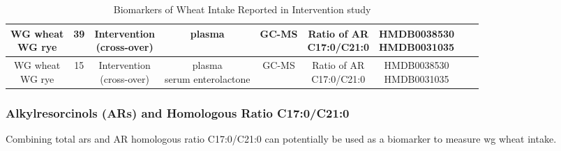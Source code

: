 \begin{table}[h!]
{\begin{tabular}{|c|c|c|c|c|c|c|c|c|}
			\makecell{WG wheat\\WG rye} & 39 & \makecell{Intervention\\ (cross-over)} & plasma & GC-MS & \makecell{Ratio of AR\\C17:0/C21:0} & \makecell{HMDB0038530\\HMDB0031035} &\cite{ISI:000376712600013} \\ 
			\hline 
			
			\makecell{WG wheat\\WG rye} & 15 & \makecell{Intervention\\ (cross-over)} & \makecell{plasma\\serum enterolactone} & GC-MS & \makecell{Ratio of AR\\C17:0/C21:0} & \makecell{HMDB0038530\\HMDB0031035} &\cite{10.1093/jn/137.5.1137} \\ 
			\hline 
	\end{tabular} }
	\caption{Biomarkers of Wheat Intake Reported in Intervention study}
	\label{table:wheat_intervention}
\end{table}

\subsubsection{Alkylresorcinols (ARs) and Homologous Ratio C17:0/C21:0}
Combining total \acrfull{ars} and AR homologous ratio C17:0/C21:0 can potentially be used as a biomarker to measure \acrshort{wg} wheat intake.


